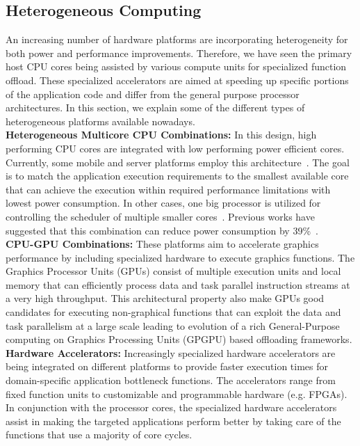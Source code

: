 \documentclass[conference]{IEEEtran}
\begin{document}
\subsection{Heterogeneous Computing}
An increasing number of hardware platforms are incorporating
heterogeneity for both power and performance improvements.
%
Therefore, we have seen the primary host CPU cores being assisted by
various compute units for specialized function offload.
%
These specialized accelerators are aimed at speeding up specific
portions of the application code and differ from the general purpose
processor architectures.
%
In this section, we explain some of the different types of heterogeneous
platforms available nowadays.\\
%
\textbf{Heterogeneous Multicore CPU Combinations:} In this design, high
performing CPU cores are integrated with low performing power efficient
cores.
%
Currently, some mobile and server platforms employ this
architecture~\cite{atom}.
%
The goal is to match the application execution requirements to the
smallest available core that can achieve the execution within required
performance limitations with lowest power consumption.
%
In other cases, one big processor is utilized for controlling the
scheduler of multiple smaller cores~\cite{nvidia}.
%
Previous works have suggested that this combination can reduce power
consumption by 39\%~\cite{powerefficiency}.\\
%
\textbf{CPU-GPU Combinations:} These platforms aim to accelerate
graphics performance by including specialized hardware to execute
graphics functions.
%
The Graphics Processor Units (GPUs) consist of multiple execution units
and local memory that can efficiently process data and task parallel
instruction streams at a very high throughput.
%
This architectural property also make GPUs good candidates for executing
non-graphical functions that can exploit the data and task parallelism
at a large scale leading to evolution of a rich General-Purpose
computing on Graphics Processing Units (GPGPU) based offloading
frameworks.\\
%
\textbf{Hardware Accelerators:} Increasingly specialized hardware
accelerators are being integrated on different platforms to provide
faster execution times for domain-specific application bottleneck
functions.
%
The accelerators range from fixed function units to customizable and
programmable hardware (e.g. FPGAs).
%
In conjunction with the processor cores, the specialized hardware
accelerators assist in making the targeted applications perform better
by taking care of the functions that use a majority of core cycles.
\end{document}

